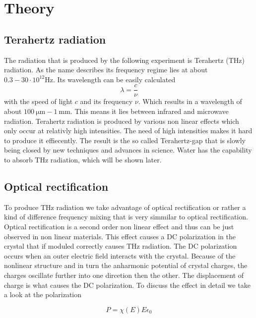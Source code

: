 \chapter{Theory}
\section{Terahertz radiation}
The radiation that is produced by the following experiment is Terahertz ($\si{\tera\hertz}$) radiation.
As the name describes its frequency regime lies at about $0.3-30\cdot10^{12}\si{\hertz}$.
Its wavelength can be easily calculated
\begin{equation}
    \lambda = \frac{c}{\nu}
\end{equation}
with the speed of light $c$ and its frequency $\nu$.
Which results in a wavelength of about $\SI{100}{\micro\meter}-\SI{1}{\milli\meter}$.
This means it lies between infrared and microwave radiation.
Terahertz radiation is produced by various non linear effects which only occur at relativly high intensities.
The need of high intensities makes it hard to produce it effiecently.
The result is the so called Terahertz-gap that is slowly being closed by new techniques and advances in science.
Water has the capability to absorb $\si{\tera\hertz}$ radiation, which will be shown later.


\section{Optical rectification}\label{sec:optic_ref}
To produce $\si{\tera\hertz}$ radiation we take advantage of optical rectification or rather a kind of difference frequency mixing that is very simmilar to optical rectification.
Optical rectification is a second order non linear effect and thus can be just observed in non linear materials.
This effect causes a DC polarization in the crystal that if moduled correctly causes $\si{\tera\hertz}$ radiation.
The DC polarization occurs when an outer electric field interacts with the crystal.
Because of the nonlinear structure and in turn the anharmonic potential of crystal charges, the charges oscillate further into one dircetion then the other.
The displacement of charge is what causes the DC polarization.
To discuss the effect in detail we take a look at the polarization

\begin{equation}
P = \chi(E) E \epsilon_0
\end{equation}

